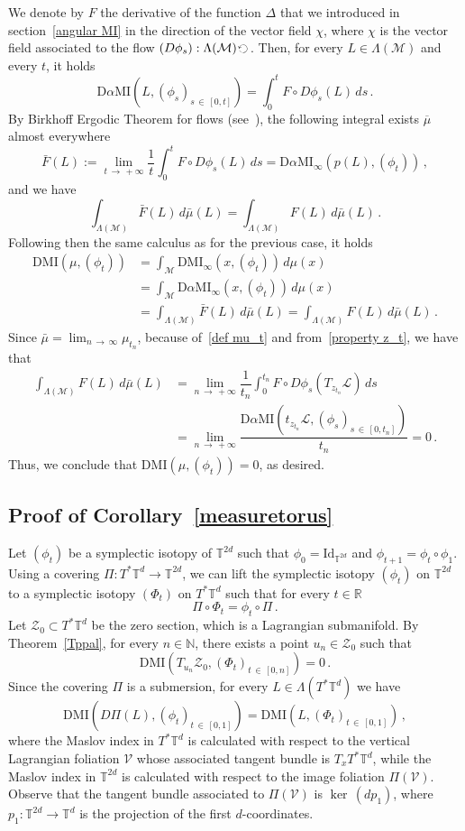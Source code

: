 \documentclass[AHL, Unicode, longabstracts, published]{cedram}
\newcommand*\M{\mathcal{M}}
\newcommand*\cl{\mathcal{L}}
\newcommand*\cv{\mathcal{V}}
\newcommand*\cz{\mathcal{Z}}
\newcommand{\rId}{\mathrm{Id}}
\newcommand{\DMI}{\mathrm{DMI}}
\newcommand{\MI}{\mathrm{MI}}
\newcommand{\rmD}{\mathrm{D}}
\newcommand*\R{\mathbb{R}}
\newcommand*\N{\mathbb{N}}
\newcommand*\T{\mathbb{T}}
\begin{document}
We denote by $F$ the derivative of the function $\Delta$ that we introduced in section~\ref{angular MI} in the direction of the vector field $\chi$, where $\chi$ is the vector field associated to the flow $(D\phi_s):\Lambda(\M)\,\rotatebox[origin=c]{90}{$\circlearrowleft$}\,$. Then, for every $L\in\Lambda(\M)$ and every $t$, it holds
\[
\rmD\alpha\MI(L,(\phi_s)_{s\,\in\,[0,t]})=\int_0^t F\circ D\phi_s(L)\, ds\,.
\]
By Birkhoff Ergodic Theorem for flows (see~\cite[Page 459]{NemSte60}), the following integral exists $\overline\mu$ almost everywhere
\[
\bar F(L):=\lim_{t\,\to\,+\infty}\dfrac 1 t \int_0^t F\circ D\phi_s(L)\, ds=\rmD\alpha\MI_\infty(p(L),(\phi_t))\,,
\]
and we have
\[
\int_{\Lambda(\M)}\bar F(L)\, d\bar \mu(L) =\int_{\Lambda(\M)}F(L)\, d\bar \mu(L)\,.
\]
Following then the same calculus as for the previous case, it holds
\[
\begin{split}
\DMI(\mu,(\phi_t))&= \int_\M \DMI_\infty (x,(\phi_t))\, d\mu(x) \\
& =\int_\M\rmD\alpha\MI_\infty(x, (\phi_t))\, d\mu(x)\\
&=\int_{\Lambda(\M)}\bar F(L)\, d\bar\mu(L)=\int_{\Lambda(\M)}F(L)\, d\bar\mu(L)\,.
\end{split}
\]
Since $\bar\mu=\lim_{n\,\to\,\infty}\mu_{t_n}$, because of~\eqref{def mu_t} and from~\eqref{property z_t}, we have that
\begin{align*}
\int_{\Lambda(\M)}F(L)\, d\bar\mu(L)&=\lim_{n\,\to\,+\infty}\dfrac{1}{t_n}\int_0^{t_n}F\circ D\phi_s(T_{z_{t_n}}\cl)\, ds\\
&= \lim_{n\,\to\,+\infty}\dfrac{\rmD\alpha\MI\left(t_{z_{t_n}}\cl, (\phi_s)_{s\,\in\,[0,t_n]}\right)}{t_n}=0\,.
\end{align*}
Thus, we conclude that $\DMI(\mu,(\phi_t))=0$, as desired.



\subsection{Proof of Corollary~\ref{measuretorus}}

Let $(\phi_t) $ be a symplectic isotopy of $\T^{2d}$ such that $\phi_0=\rId_{\T^{2d}}$ and $\phi_{t+1}=\phi_t\circ\phi_1$. Using a covering $\Pi:T^*\T^d\to\T^{2d}$, we can lift the symplectic isotopy $(\phi_t) $ on $\T^{2d}$ to a symplectic isotopy $(\Phi_t) $ on $T^*\T^d$ such that for every $t\in\R$
\[
\Pi\circ \Phi_t=\phi_t\circ\Pi\,.
\]
Let $\cz_0\subset T^*\T^d$ be the zero section, which is a Lagrangian submanifold. By Theorem~\ref{Tppal}, for every $n\in\N$, there exists a point $u_n\in\cz_0$ such that
\[
\DMI\left(T_{u_n}\cz_0, (\Phi_t)_{t\,\in\,[0,n]}\right)=0\,.
\]
Since the covering $\Pi$ is a submersion, for every $L\in\Lambda(T^*\T^d)$ we have
\[
\DMI\left(D\Pi(L), (\phi_t)_{t\,\in\,[0,1]}\right)=\DMI\left(L,(\Phi_t)_{t\,\in\,[0,1]}\right)\,,
\]
where the Maslov index in $T^*\T^d$ is calculated with respect to the vertical Lagrangian foliation $\cv$ whose associated tangent bundle is $T_xT^*\T^d$, while the Maslov index in $\T^{2d}$ is calculated with respect to the image foliation $\Pi(\cv)$. Observe that the tangent bundle associated to $\Pi(\cv)$ is $\ker\,(dp_1)$, where $p_1:\T^{2d}\to \T^d$ is the projection of the first $d$-coordinates.
\end{document}

